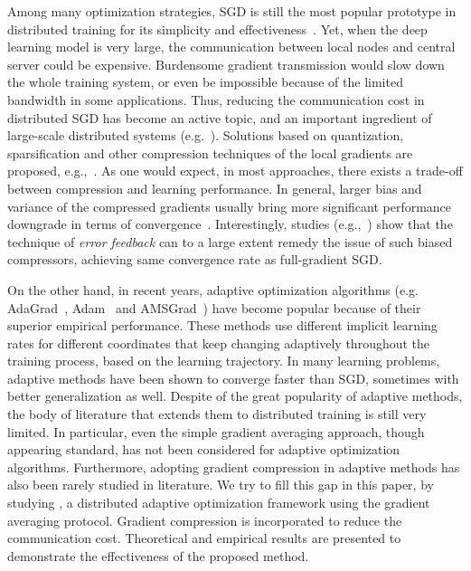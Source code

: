 \documentclass[11pt]{article}
\begin{document}
Among many optimization strategies, SGD is still the most popular prototype in distributed training for its simplicity and effectiveness~\cite{chilimbi2014project,Proc:Agrawal_NIPS19,mikami2018massively}. Yet, when the deep learning model is very large, the communication between local nodes and central server could be expensive. Burdensome gradient transmission would slow down the whole training system, or even be impossible because of the limited bandwidth in some applications. Thus, reducing the communication cost in distributed SGD has become an active topic, and an important ingredient of large-scale distributed systems (e.g.~\cite{Proc:Seide14}). Solutions based on quantization, sparsification and other compression techniques of the local gradients are proposed, e.g.,~\cite{alistarh2017qsgd,wen2017terngrad,wangni2018gradient,stich2018sparsified,aji2017sparse,bernstein2018signsgd,de2017understanding,yang2019swalp,Proc:Ivkin_NIPS19}. As one would expect, in most approaches, there exists a trade-off between compression and learning performance. In general, larger bias and variance of the compressed gradients usually bring more significant performance downgrade in terms of convergence~\cite{stich2018sparsified,ajalloeian2020analysis}. Interestingly, studies (e.g.,~\cite{karimireddy2019error}) show that the technique of \textit{error feedback} can to a large extent remedy the issue of such biased compressors, achieving same convergence rate as full-gradient SGD.


On the other hand, in recent years, adaptive optimization algorithms (e.g. AdaGrad~\cite{Duchi10-adagrad}, Adam~\cite{kingma2014adam} and AMSGrad~\cite{reddi2019convergence}) have become popular because of their superior empirical performance. These methods use different implicit learning rates for different coordinates that keep changing adaptively throughout the training process, based on the learning trajectory. In many learning problems, adaptive methods have been shown to converge faster than SGD, sometimes with better generalization as well. Despite of the great popularity of adaptive methods, the body of literature that extends them to distributed training is still very limited. In particular, even the simple gradient averaging approach, though appearing standard, has not been considered for adaptive optimization algorithms. Furthermore, adopting gradient compression in adaptive methods has also been rarely studied in literature. We try to fill this gap in this paper, by studying \algo , a distributed adaptive optimization framework using the gradient averaging protocol. Gradient compression is incorporated to reduce the communication cost. Theoretical and empirical results are presented to demonstrate the effectiveness of the proposed method.
\end{document}
